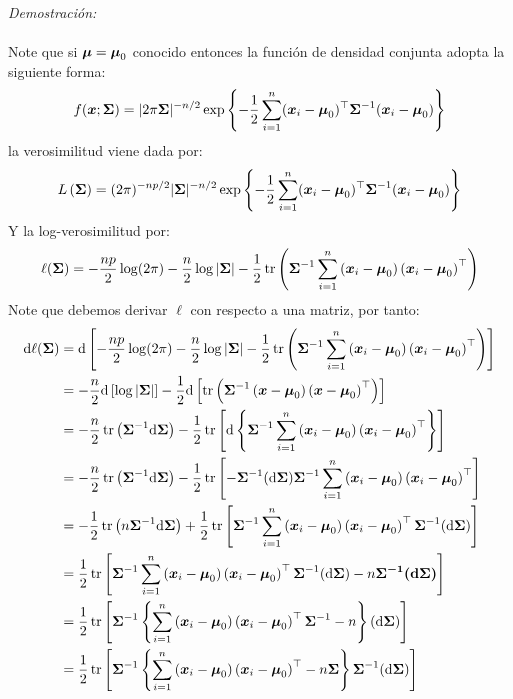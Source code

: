 \emph{Demostración:}\\
\\
Note que si $\bf{\mu} =\bf{\mu}_0$ conocido entonces la función de densidad conjunta adopta la siguiente forma:
$$
f(\boldsymbol{x};\bf{\Sigma})=|2 \pi \boldsymbol{\Sigma}|^{-n / 2} \exp \left\{-\frac{1}{2}\suma(\boldsymbol{x}_i-\boldsymbol{\mu}_0)^{\top} \boldsymbol{\Sigma}^{-1}(\boldsymbol{x}_i-\boldsymbol{\mu}_0)\right\}
$$
la verosimilitud viene dada por:
$$
L\left(\bf{\Sigma}\right) = (2 \pi)^{-np/2} |\boldsymbol{\Sigma}|^{-n / 2} \exp \left\{-\frac{1}{2}\suma(\boldsymbol{x}_i-\boldsymbol{\mu}_0)^{\top} \boldsymbol{\Sigma}^{-1}(\boldsymbol{x}_i-\boldsymbol{\mu}_0)\right\}
$$
Y la log-verosimilitud por:
$$
\ell(\boldsymbol{\Sigma})=-\frac{np}{2}\log(2\pi)-\frac{n}{2} \log |\boldsymbol{\Sigma}|-\frac{1}{2} \operatorname{tr}\left( \boldsymbol{\Sigma}^{-1}\suma \parcurvo{
\bf{x}_i - \bf{\mu}_0
}\parcurvo{
\bf{x}_i - \bf{\mu}_0
}^\top\right)
$$
Note que debemos derivar $\ell$ con respecto a una matriz, por tanto:
\begin{align*}
\de \ell(\bf{\Sigma}) &= \de\parcerrado{
-\frac{np}{2}\log(2\pi)-\frac{n}{2} \log |\boldsymbol{\Sigma}|-\frac{1}{2} \operatorname{tr}\left( \boldsymbol{\Sigma}^{-1}\suma \parcurvo{
\bf{x}_i - \bf{\mu}_0
}\parcurvo{
\bf{x}_i - \bf{\mu}_0
}^\top\right)
}\\
&= -\dfrac{n}{2} \de \parcerrado{\log|\bf{\Sigma}|} -\dfrac{1}{2} \de \parcerrado{\operatorname{tr}\left( \boldsymbol{\Sigma}^{-1} \parcurvo{
\bf{x} - \bf{\mu}_0
}\parcurvo{
\bf{x} - \bf{\mu}_0
}^\top\right)}\\
&= -\dfrac{n}{2} \tr\parcurvo{\bf{\Sigma}^{-1} \de \bf{\Sigma}} - \dfrac{1}{2}\tr\parcerrado{
\de\parllave{
\bf{\Sigma}^{-1}\suma \parcurvo{
\bf{x}_i - \bf{\mu}_0
}\parcurvo{
\bf{x}_i - \bf{\mu}_0
}^\top
}
}\\
&= -\dfrac{n}{2} \tr\parcurvo{\bf{\Sigma}^{-1} \de \bf{\Sigma}}- \dfrac{1}{2} \tr\parcerrado{
-\bf{\Sigma}^{-1}(\de \bf{\Sigma}) \bf{\Sigma}^{-1} \suma \parcurvo{
\bf{x}_i - \bf{\mu}_0
}\parcurvo{
\bf{x}_i - \bf{\mu}_0
}^\top
}\\
&=-\dfrac{1}{2} \tr\parcurvo{n\bf{\Sigma}^{-1} \de \bf{\Sigma}}+ \dfrac{1}{2} \tr\parcerrado{\bf{\Sigma}^{-1} \suma \parcurvo{
\bf{x}_i - \bf{\mu}_0
}\parcurvo{
\bf{x}_i - \bf{\mu}_0
}^\top
\bf{\Sigma}^{-1}(\de \bf{\Sigma}) 
}\\
&= \dfrac{1}{2}\tr\parcerrado{\bf{\Sigma}^{-1} \suma \parcurvo{
\bf{x}_i - \bf{\mu}_0
}\parcurvo{
\bf{x}_i - \bf{\mu}_0
}^\top
\bf{\Sigma}^{-1}(\de \bf{\Sigma}) - n\bf{\Sigma^{-1}(\de \bf{\Sigma})
}
}\\
&= \dfrac{1}{2}\tr\parcerrado{\bf{\Sigma}^{-1}\parllave{ \suma \parcurvo{
\bf{x}_i - \bf{\mu}_0
}\parcurvo{
\bf{x}_i - \bf{\mu}_0
}^\top
\bf{\Sigma}^{-1}-n}(\de \bf{\Sigma})
}\\
&= \dfrac{1}{2}\tr\parcerrado{\bf{\Sigma}^{-1}\parllave{ \suma \parcurvo{
\bf{x}_i - \bf{\mu}_0
}\parcurvo{
\bf{x}_i - \bf{\mu}_0
}^\top
-n\bf{\Sigma}}\bf{\Sigma}^{-1}(\de \bf{\Sigma})
}
\end{align*}
